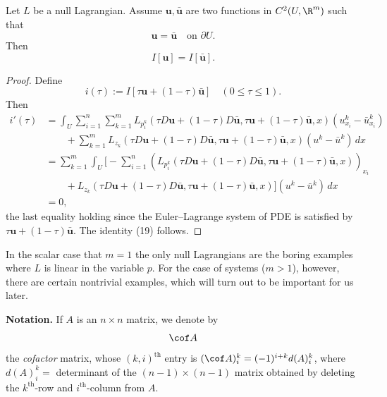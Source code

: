 \begin{theorem}
\label{thm:null-lagrangians-boundary-conditions}
Let $L$ be a null Lagrangian. Assume $\mathbf{u}, \bar{\mathbf{u}}$ are two functions in $C^2(U, \R^m)$ such that
\[
\mathbf{u} = \bar{\mathbf{u}} \quad \text{on } \partial U .
\tag{18}
\]
Then
\[
I[\mathbf{u}] = I[\bar{\mathbf{u}}] .
\tag{19}
\]
\end{theorem}
\begin{proof}
Define
\[
i(\tau) := I[\tau \mathbf{u} + (1-\tau)\bar{\mathbf{u}}] \quad (0 \le \tau \le 1) .
\]
Then
\[
\begin{aligned}
i'(\tau) &= \int_U \sum_{i=1}^{n} \sum_{k=1}^{m} L_{p_i^k}(\tau D\mathbf{u} + (1-\tau)D\bar{\mathbf{u}}, \tau \mathbf{u} + (1-\tau)\bar{\mathbf{u}}, x)(u^k_{x_i} - \bar{u}^k_{x_i}) \\
&\qquad + \sum_{k=1}^{m} L_{z_k}(\tau D\mathbf{u} + (1-\tau)D\bar{\mathbf{u}}, \tau \mathbf{u} + (1-\tau)\bar{\mathbf{u}}, x)(u^k - \bar{u}^k) \, dx \\
&= \sum_{k=1}^{m} \int_U \Big[ -\sum_{i=1}^{n} (L_{p_i^k}(\tau D\mathbf{u} + (1-\tau)D\bar{\mathbf{u}}, \tau \mathbf{u} + (1-\tau)\bar{\mathbf{u}}, x))_{x_i} \\
&\qquad + L_{z_k}(\tau D\mathbf{u} + (1-\tau)D\bar{\mathbf{u}}, \tau \mathbf{u} + (1-\tau)\bar{\mathbf{u}}, x) \Big] (u^k - \bar{u}^k) \, dx \\
&= 0,
\end{aligned}
\]
the last equality holding since the Euler--Lagrange system of PDE is satisfied by $\tau \mathbf{u} + (1 - \tau)\bar{\mathbf{u}}$. The identity (19) follows.
\end{proof}

In the scalar case that $m = 1$ the only null Lagrangians are the boring examples where $L$ is linear in the variable $p$. For the case of systems ($m > 1$), however, there are certain nontrivial examples, which will turn out to be important for us later.

\noindent\textbf{Notation.} If $A$ is an $n \times n$ matrix, we denote by
\[
\cof A
\]
the \textit{cofactor} matrix, whose $(k,i)^{\text{th}}$ entry is $(\cof A)^k_i = (-1)^{i+k}d(A)^k_i$, where $d(A)^k_i =$ determinant of the $(n-1) \times (n-1)$ matrix obtained by deleting the $k^{\text{th}}$-row and $i^{\text{th}}$-column from $A$.

